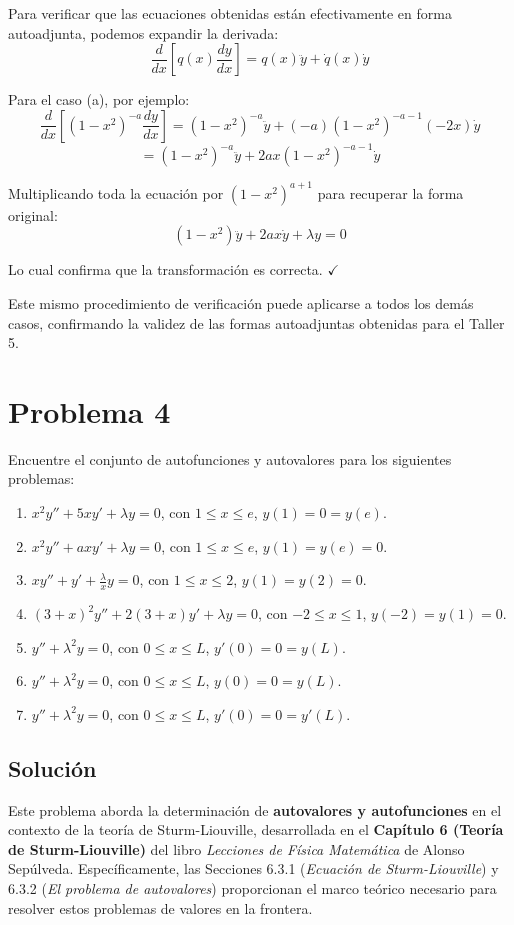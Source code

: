 \documentclass[a4paper]{article}
\begin{document}
Para verificar que las ecuaciones obtenidas están efectivamente en forma autoadjunta, podemos expandir la derivada:
$$
\frac{d}{dx}\left[q(x)\frac{dy}{dx}\right] = q(x)\ddot{y} + \dot{q}(x)\dot{y}
$$

Para el caso (a), por ejemplo:
$$
\frac{d}{dx}\left[(1 - x^2)^{-a}\frac{dy}{dx}\right] = (1 - x^2)^{-a}\ddot{y} + (-a)(1 - x^2)^{-a-1}(-2x)\dot{y}
$$
$$
= (1 - x^2)^{-a}\ddot{y} + 2ax(1 - x^2)^{-a-1}\dot{y}
$$

Multiplicando toda la ecuación por $(1 - x^2)^{a+1}$ para recuperar la forma original:
$$
(1 - x^2)\ddot{y} + 2ax\dot{y} + \lambda y = 0
$$

Lo cual confirma que la transformación es correcta. $\checkmark$

Este mismo procedimiento de verificación puede aplicarse a todos los demás casos, confirmando la validez de las formas autoadjuntas obtenidas para el Taller 5.



\section{Problema 4}
Encuentre el conjunto de autofunciones y autovalores para los siguientes problemas:
\begin{enumerate}
    \item[(a)] $x^2y'' + 5xy' + \lambda y = 0$, con $1 \leq x \leq e$, $y(1) = 0 = y(e)$.
    \item[(b)] $x^2y'' + axy' + \lambda y = 0$, con $1 \leq x \leq e$, $y(1) = y(e) = 0$.
    \item[(c)] $xy'' + y' + \frac{\lambda}{x}y = 0$, con $1 \leq x \leq 2$, $y(1) = y(2) = 0$.
    \item[(d)] $(3+x)^2y'' + 2(3+x)y' + \lambda y = 0$, con $-2 \leq x \leq 1$, $y(-2) = y(1) = 0$.
    \item[(e)] $y'' + \lambda^2 y = 0$, con $0 \leq x \leq L$, $y'(0) = 0 = y(L)$.
    \item[(f)] $y'' + \lambda^2 y = 0$, con $0 \leq x \leq L$, $y(0) = 0 = y(L)$.
    \item[(g)] $y'' + \lambda^2 y = 0$, con $0 \leq x \leq L$, $y'(0) = 0 = y'(L)$.
\end{enumerate}

\subsection{Solución}

Este problema aborda la determinación de \textbf{autovalores y autofunciones} en el contexto de la teoría de Sturm-Liouville, desarrollada en el \textbf{Capítulo 6 (Teoría de Sturm-Liouville)} del libro \textit{Lecciones de Física Matemática} de Alonso Sepúlveda. Específicamente, las Secciones 6.3.1 (\textit{Ecuación de Sturm-Liouville}) y 6.3.2 (\textit{El problema de autovalores}) proporcionan el marco teórico necesario para resolver estos problemas de valores en la frontera.
\end{document}
